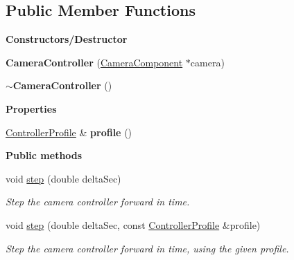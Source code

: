 \subsection*{Public Member Functions}
\begin{Indent}\textbf{ Constructors/\+Destructor}\par
\begin{DoxyCompactItemize}
\item 
\mbox{\label{classrev_1_1_camera_controller_a06b17ff4c8a7b0d2bfe3d2ab91c007d8}} 
{\bfseries Camera\+Controller} (\mbox{\hyperlink{classrev_1_1_camera_component}{Camera\+Component}} $\ast$camera)
\item 
\mbox{\label{classrev_1_1_camera_controller_afaa3e72079cdd626ecf8f653db017d8b}} 
{\bfseries $\sim$\+Camera\+Controller} ()
\end{DoxyCompactItemize}
\end{Indent}
\begin{Indent}\textbf{ Properties}\par
\begin{DoxyCompactItemize}
\item 
\mbox{\label{classrev_1_1_camera_controller_ae47aa8ef49755565492ca02779715492}} 
\mbox{\hyperlink{structrev_1_1_camera_controller_1_1_controller_profile}{Controller\+Profile}} \& {\bfseries profile} ()
\end{DoxyCompactItemize}
\end{Indent}
\begin{Indent}\textbf{ Public methods}\par
\begin{DoxyCompactItemize}
\item 
\mbox{\label{classrev_1_1_camera_controller_a39eb3a1cdf7be438532017f2eb2c0790}} 
void \mbox{\hyperlink{classrev_1_1_camera_controller_a39eb3a1cdf7be438532017f2eb2c0790}{step}} (double delta\+Sec)
\begin{DoxyCompactList}\small\item\em Step the camera controller forward in time. \end{DoxyCompactList}\item 
\mbox{\label{classrev_1_1_camera_controller_a4657274a783679a0cedc4df9303603df}} 
void \mbox{\hyperlink{classrev_1_1_camera_controller_a4657274a783679a0cedc4df9303603df}{step}} (double delta\+Sec, const \mbox{\hyperlink{structrev_1_1_camera_controller_1_1_controller_profile}{Controller\+Profile}} \&profile)
\begin{DoxyCompactList}\small\item\em Step the camera controller forward in time, using the given profile. \end{DoxyCompactList}\end{DoxyCompactItemize}
\end{Indent}
